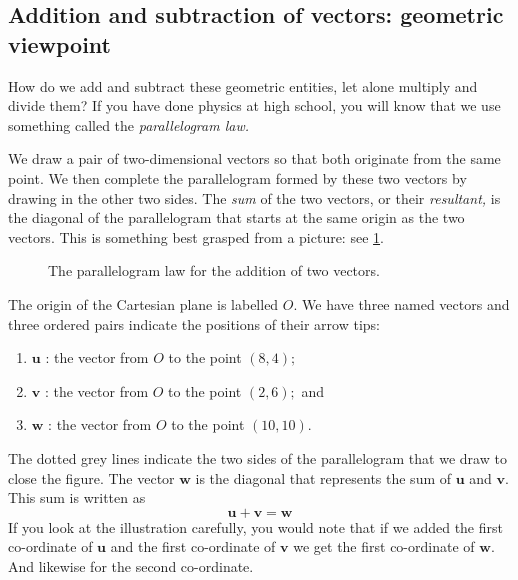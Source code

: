 \documentclass[
  a4paper,
]{article}
\providecommand{\tightlist}{%
  \setlength{\itemsep}{0pt}\setlength{\parskip}{0pt}}
\begin{document}
\hypertarget{addition-and-subtraction-of-vectors-geometric-viewpoint}{%
\subsection{Addition and subtraction of vectors: geometric
viewpoint}\label{addition-and-subtraction-of-vectors-geometric-viewpoint}}

How do we add and subtract these geometric entities, let alone multiply
and divide them? If you have done physics at high school, you will know
that we use something called the \emph{parallelogram law.}

We draw a pair of two-dimensional vectors so that both originate from
the same point. We then complete the parallelogram formed by these two
vectors by drawing in the other two sides. The \emph{sum} of the two
vectors, or their \emph{resultant,} is the diagonal of the parallelogram
that starts at the same origin as the two vectors. This is something
best grasped from a picture: see \cref{fig:vector-sum}.

\begin{figure}
\hypertarget{fig:vector-sum}{%
\centering

\caption{The parallelogram law for the addition of two
vectors.}\label{fig:vector-sum}
}
\end{figure}

The origin of the Cartesian plane is labelled \(O\). We have three named
vectors and three ordered pairs indicate the positions of their arrow
tips:

\begin{enumerate}
\tightlist
\item
  \(\mathbf{u}\) : the vector from \(O\) to the point \((8, 4);\)
\item
  \(\mathbf{v}\) : the vector from \(O\) to the point \((2, 6);\) and
\item
  \(\mathbf{w}\) : the vector from \(O\) to the point \((10, 10)\).
\end{enumerate}

The dotted grey lines indicate the two sides of the parallelogram that
we draw to close the figure. The vector \(\mathbf{w}\) is the diagonal
that represents the sum of \(\mathbf{u}\) and \(\mathbf{v}\). This sum
is written as \[
\mathbf{u} + \mathbf{v} = \mathbf{w}
\] If you look at the illustration carefully, you would note that if we
added the first co-ordinate of \(\mathbf{u}\) and the first co-ordinate
of \(\mathbf{v}\) we get the first co-ordinate of \(\mathbf{w}\). And
likewise for the second co-ordinate.
\end{document}
